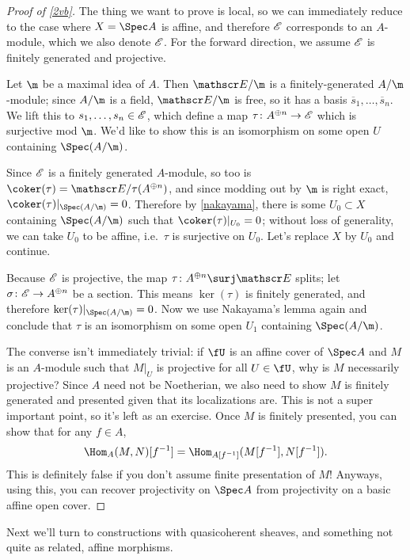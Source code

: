 \begin{proof}[Proof of \cref{2vb}]
The thing we want to prove is local, so we can immediately reduce to the case where $X = \Spec A$ is affine, and
therefore $\mathscr E$ corresponds to an $A$-module, which we also denote $\mathscr E$. For the forward direction, we assume
$\mathscr E$ is finitely generated and projective.

Let $\m$ be a maximal idea of $A$. Then $\sE/\m$ is a finitely-generated $A/\m$-module; since $A/\m$ is a field,
$\sE/\m$ is free, so it has a basis $\overline s_1,\dotsc,\overline s_n$. We lift this to $s_1,\dotsc,s_n\in\mathscr E$,
which define a map $\tau\colon A^{\oplus n}\to \mathscr E$ which is surjective mod $\m$. We'd like to show this is an
isomorphism on some open $U$ containing $\Spec(A/\m)$.

Since $\mathscr E$ is a finitely generated $A$-module, so too is $\coker(\tau) = \sE/\tau(A^{\oplus n})$, and since
modding out by $\m$ is right exact, $\coker(\tau)|_{\Spec(A/\m)} = 0$. Therefore by \cref{nakayama}, there is some
$U_0\subset X$ containing $\Spec(A/\m)$ such that $\coker(\tau)|_{U_0} = 0$; without loss of generality, we can
take $U_0$ to be affine, i.e.\ $\tau$ is surjective on $U_0$. Let's replace $X$ by $U_0$ and continue.

Because $\mathscr E$ is projective, the map $\tau\colon A^{\oplus n}\surj\sE$ splits; let $\sigma\colon\mathscr E\to A^{\oplus
n}$ be a section. This means $\ker(\tau)$ is finitely generated, and therefore $\ker(\tau)|_{\Spec(A/\m)} = 0$. Now
we use Nakayama's lemma again and conclude that $\tau$ is an isomorphism on some open $U_1$ containing
$\Spec(A/\m)$.

The converse isn't immediately trivial: if $\fU$ is an affine cover of $\Spec A$ and $M$ is an $A$-module such that
$M|_U$ is projective for all $U\in\fU$, why is $M$ necessarily projective? Since $A$ need not be
Noetherian, we also need to show $M$ is finitely generated and presented given that its localizations are. This is
not a super important point, so it's left as an exercise. Once $M$ is finitely presented, you can show that for
any $f\in A$,
\begin{equation}
	\Hom_A(M, N)[f^{-1}] = \Hom_{A[f^{-1}]}(M[f^{-1}], N[f^{-1}]).
\end{equation}
This is definitely false if you don't assume finite presentation of $M$! Anyways, using this, you can recover
projectivity on $\Spec A$ from projectivity on a basic affine open cover.
\end{proof}
Next we'll turn to constructions with quasicoherent sheaves, and something not quite as related, affine morphisms.
